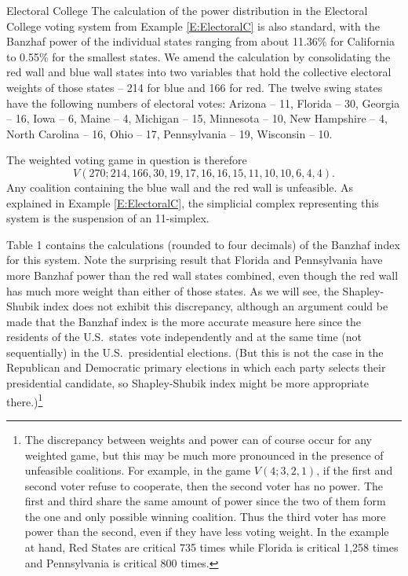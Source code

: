 \documentclass[11pt]{amsart}
\theoremstyle{plain}
\theoremstyle{definition}
\theoremstyle{remark}
\begin{document}
\begin{subsubsection}{Electoral College}\label{SSS:EC}
The calculation of the power distribution in the Electoral College voting system from Example \ref{E:ElectoralC} is also standard, with the Banzhaf power of the individual states ranging from about 11.36\% for California to 0.55\% for the smallest states. We amend the calculation by consolidating the red wall and blue wall states into two variables that hold the collective electoral weights of those states -- 214 for blue and 166 for red. The twelve swing states have the following numbers of electoral votes: Arizona -- 11, Florida -- 30, Georgia  -- 16, Iowa --  6, Maine --  4, Michigan  --  15, Minnesota  --  10, New Hampshire  --  4, North Carolina  --  16, Ohio  --  17, Pennsylvania  --  19, Wisconsin  --  10.

The weighted voting game in question is therefore
$$
V(270;214,166, 30, 19, 17, 16, 16, 15, 11, 10, 10, 6, 4, 4).
$$
Any coalition containing the blue wall and the red wall is unfeasible. As explained in Example \ref{E:ElectoralC}, the simplicial complex representing this system is the suspension of an 11-simplex.

Table 1 contains the calculations (rounded to four decimals) of the Banzhaf index for this system. Note the surprising result that Florida and Pennsylvania have more Banzhaf power than the red wall states combined, even though the red wall has much more weight than either of those states. As we will see, the Shapley-Shubik index does not exhibit this discrepancy, although an argument could be made that the Banzhaf index is the more accurate measure here since the residents of the U.S.~states vote independently and at the same time (not sequentially) in the U.S.~presidential elections. (But this is not the case in the Republican and Democratic primary elections in which each party selects their presidential candidate, so Shapley-Shubik index might be more appropriate there.)\footnote{The discrepancy between weights and power can of course occur for any weighted game, but this may be much more pronounced in the presence of unfeasible coalitions. For example, in the game $V(4; 3, 2, 1)$, if the first and second voter refuse to cooperate, then the second voter has no power. The first and third share the same amount of power since the two of them form the one and only possible winning coalition. Thus the third voter has more power than the second, even if they have less voting weight. In the example at hand, Red States are critical 735 times while Florida is critical 1,258 times and Pennsylvania is critical 800 times.}



\end{subsubsection}
\end{document}
